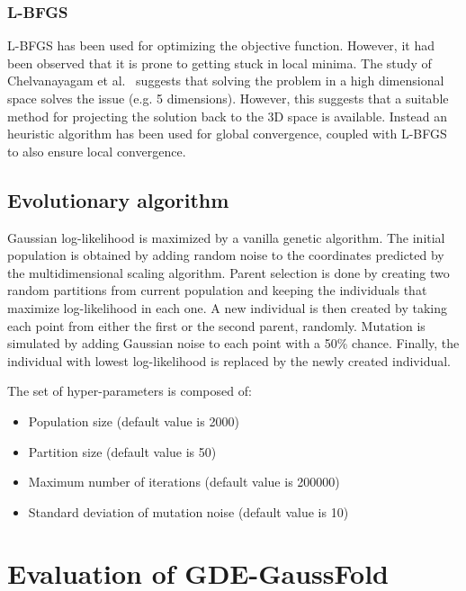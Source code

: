     \subsubsection{L-BFGS}

        L-BFGS has been used for optimizing the objective function. However, it had been
        observed that it is prone to getting stuck in local minima.
        The study of Chelvanayagam et al.~\cite{chelvanayagam1998combinatorial} suggests
        that solving the problem in a high dimensional space solves the issue (e.g. 5 dimensions).
        However, this suggests that a suitable method for projecting the solution back to the 3D space is available.
        Instead an heuristic algorithm has been used for global convergence, coupled with L-BFGS to also
        ensure local convergence.

    \subsection{Evolutionary algorithm}

        Gaussian log-likelihood is maximized by a vanilla genetic algorithm.
        The initial population is obtained by adding random noise to the coordinates
        predicted by the multidimensional scaling algorithm.
        Parent selection is done by creating two random partitions from current population
        and keeping the individuals that maximize log-likelihood in each one.
        A new individual is then created by taking each point from either the first
        or the second parent, randomly. Mutation is simulated by adding Gaussian noise
        to each point with a 50\% chance.
        Finally, the individual with lowest log-likelihood is replaced by the
        newly created individual.

        The set of hyper-parameters is composed of:
        \begin{itemize}
            \item Population size (default value is 2000)
            \item Partition size (default value is 50)
            \item Maximum number of iterations (default value is 200000)
            \item Standard deviation of mutation noise (default value is 10)
        \end{itemize}

\section{Evaluation of GDE-GaussFold}

